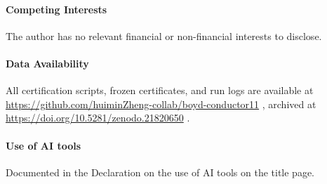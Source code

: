 \documentclass[11pt]{amsart}
\theoremstyle{definition}
\theoremstyle{remark}
\begin{document}
\paragraph{Competing Interests} The author has no relevant financial or
non-financial interests to disclose.

\paragraph{Data Availability} All certification scripts, frozen
certificates, and run logs are available at
\url{https://github.com/huiminZheng-collab/boyd-conductor11} , archived at
\url{https://doi.org/10.5281/zenodo.21820650} .

\paragraph{Use of AI tools} Documented in the Declaration on the use of AI
tools on the title page.
\end{document}
